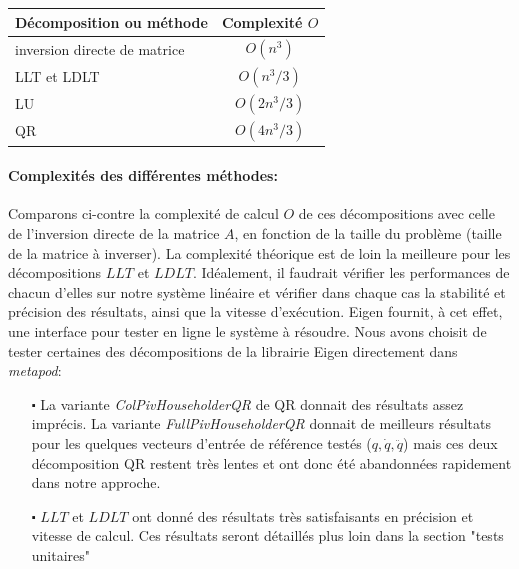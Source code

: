 \documentclass{report}
\begin{document}
\setlength{\intextsep}{0pt}
\setlength{\columnsep}{0cm}
\begin{table}\raggedleft
\begin{tabular}[H]{|l|c|}
\hline
Décomposition ou méthode & Complexité $O$ \\ \hline \hline
inversion directe de matrice & $O(n^3)$ \\ \hline
LLT et LDLT & $O(n^3/3)$ \\ \hline
LU & $O(2n^3/3)$ \\ \hline
QR & $O(4n^3/3)$ \\
\hline
\end{tabular}
\end{table}

\paragraph*{Complexités des différentes méthodes:}
Comparons ci-contre la complexité de calcul $O$ de ces décompositions avec celle de l'inversion directe de la matrice $A$, en fonction de la taille du problème (taille de la matrice à inverser). La complexité théorique est de loin la meilleure pour les décompositions $LLT$ et $LDLT$. Idéalement, il faudrait vérifier les performances de chacun d'elles sur notre système linéaire et vérifier dans chaque cas la stabilité et précision des résultats, ainsi que la vitesse d'exécution. Eigen fournit, à cet effet, une interface pour tester en ligne le système à résoudre. Nous avons choisit de tester certaines des décompositions de la librairie Eigen directement dans \emph{metapod}:
\begin{itemize}
\item[$\centerdot$] La variante \emph{ColPivHouseholderQR} de QR donnait des résultats assez imprécis. La variante \emph{FullPivHouseholderQR} donnait de meilleurs résultats pour les quelques vecteurs d'entrée de référence testés ($q, \dot{q}, \ddot{q}$) mais ces deux décomposition QR restent très lentes et ont donc été abandonnées rapidement dans notre approche.
\item[$\centerdot$] $LLT$  et $LDLT$ ont donné des résultats très satisfaisants en précision et vitesse de calcul. Ces résultats seront détaillés plus loin dans la section "tests unitaires"
\end{itemize}
\end{document}
